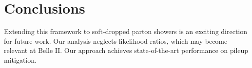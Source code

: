 \section{Conclusions}\label{sec:conclusions}

Extending this framework to soft-dropped parton showers is an exciting
direction for future work. Our analysis neglects likelihood ratios,
which may become relevant at Belle II. Our approach achieves
state-of-the-art performance on pileup mitigation.

